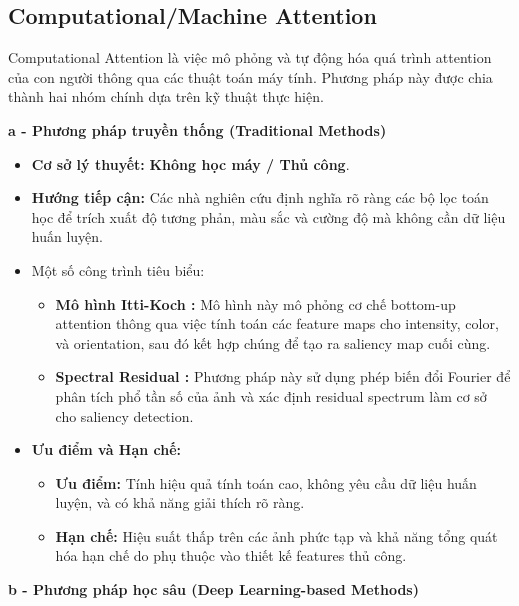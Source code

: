 \subsection{Computational/Machine Attention}

Computational Attention là việc mô phỏng và tự động hóa quá trình attention của con người thông qua các thuật toán máy tính. Phương pháp này được chia thành hai nhóm chính dựa trên kỹ thuật thực hiện.

\textbf{a - Phương pháp truyền thống (Traditional Methods)}
\begin{itemize}
\item \textbf{Cơ sở lý thuyết:} \textbf{Không học máy / Thủ công}.
\item \textbf{Hướng tiếp cận:} Các nhà nghiên cứu định nghĩa rõ ràng các bộ lọc toán học để trích xuất độ tương phản, màu sắc và cường độ mà không cần dữ liệu huấn luyện.
\item Một số công trình tiêu biểu:
\begin{itemize}
    \item \textbf{Mô hình Itti-Koch \cite{itti1998model}:} Mô hình này mô phỏng cơ chế bottom-up attention thông qua việc tính toán các feature maps cho intensity, color, và orientation, sau đó kết hợp chúng để tạo ra saliency map cuối cùng.
    \item \textbf{Spectral Residual \cite{sr_2007}:} Phương pháp này sử dụng phép biến đổi Fourier để phân tích phổ tần số của ảnh và xác định residual spectrum làm cơ sở cho saliency detection.
\end{itemize}
\item \textbf{Ưu điểm và Hạn chế:}
    \begin{itemize}
        \item \textbf{Ưu điểm:} Tính hiệu quả tính toán cao, không yêu cầu dữ liệu huấn luyện, và có khả năng giải thích rõ ràng.          
        \item \textbf{Hạn chế:} Hiệu suất thấp trên các ảnh phức tạp và khả năng tổng quát hóa hạn chế do phụ thuộc vào thiết kế features thủ công.
    \end{itemize}
\end{itemize}
\textbf{b - Phương pháp học sâu (Deep Learning-based Methods)}

